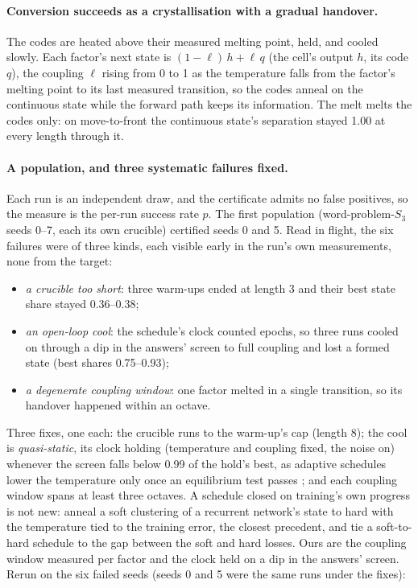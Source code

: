 \documentclass[11pt]{article}
\begin{document}
\paragraph{Conversion succeeds as a crystallisation with a gradual handover.} The codes are heated
above their measured melting point, held, and cooled slowly. Each factor's next state is
$(1 - \ell)\,h + \ell\,q$ (the cell's output $h$, its code $q$), the coupling $\ell$ rising from 0 to
1 as the temperature falls from the factor's melting point to its last measured transition, so the
codes anneal on the continuous state while the forward path keeps its information. The melt melts
the codes only: on move-to-front the continuous state's separation stayed 1.00 at every length
through it.

\paragraph{A population, and three systematic failures fixed.} Each run is an independent draw, and
the certificate admits no false positives, so the measure is the per-run success rate $p$. The first
population (word-problem-$S_3$ seeds 0--7, each its own crucible) certified seeds 0 and 5. Read in
flight, the six failures were of three kinds, each visible early in the run's own measurements, none
from the target:
\begin{itemize}
  \item \emph{a crucible too short}: three warm-ups ended at length 3 and their best state share stayed
  0.36--0.38;
  \item \emph{an open-loop cool}: the schedule's clock counted epochs, so three runs cooled on through
  a dip in the answers' screen to full coupling and lost a formed state (best shares 0.75--0.93);
  \item \emph{a degenerate coupling window}: one factor melted in a single transition, so its handover
  happened within an octave.
\end{itemize}
Three fixes, one each: the crucible runs to the warm-up's cap (length 8); the cool is
\emph{quasi-static}, its clock holding (temperature and coupling fixed, the noise on) whenever the
screen falls below 0.99 of the hold's best, as adaptive schedules lower the temperature only once
an equilibrium test passes \citep{huang-1986-efficient-cooling-schedule,romeo-1989-simulated-annealing-theory-layout};
and each coupling window spans at least three octaves. A schedule closed on training's own progress
is not new: \citet{das-1993-unified-gradient-clustering-fsm-induction} anneal a soft clustering of a
recurrent network's state to hard with the temperature tied to the training error, the closest
precedent, and \citet{agustsson-2017-soft-to-hard-vector-quantization} tie a soft-to-hard schedule
to the gap between the soft and hard losses. Ours are the coupling window measured per factor and
the clock held on a dip in the answers' screen.
Rerun on the six failed seeds (seeds 0 and 5 were the same runs under the fixes):
\end{document}

